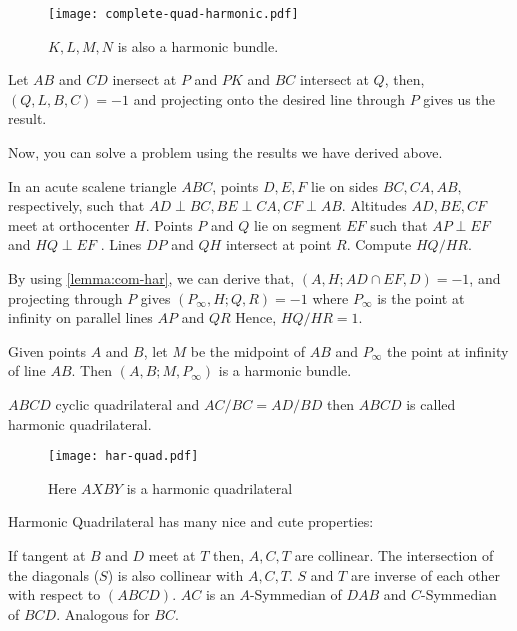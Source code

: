 \begin{figure}[h!t]
\centering
	\texttt{[image: complete-quad-harmonic.pdf]}
	\caption{$K,L,M,N$ is also a harmonic bundle.}
\end{figure}

Let $AB$ and $CD$ inersect at $P$ and $PK$ and $BC$ intersect at $Q$, then, $(Q,L,B,C)=-1$ and projecting onto the desired line through $P$ gives us the result.

Now, you can solve a problem using the results we have derived above.

\begin{example}
In an acute scalene triangle $ABC$, points $D, E, 
F$ lie on sides $BC, CA, AB,$ respectively, such that $AD \perp BC, BE \perp CA, CF \perp AB$.
Altitudes $AD, BE, CF$ meet at orthocenter $H$. 
Points $P$ and $Q$ lie on segment $EF$ such that 
$AP \perp EF$ and $H Q \perp EF$ . Lines $DP$ and $QH$  intersect 
at point $R$. Compute $HQ/HR$.
\end{example}

By using \autoref{lemma:com-har},  we can derive that,  
$(A,H; AD \cap EF , D)=-1$, and projecting through $P$
 gives  $(P_{\infty}, H ; Q, R)=-1$ where $P_{\infty}$
 is the point at infinity on parallel lines $AP$ and
  $QR$ Hence, $HQ/HR=1$.

\begin{lemma}
Given points $A$ and $B$, let $M$ be the
midpoint of $AB$ and $P_{\infty}$ the point at infinity of line $AB$. Then $(A, B; M, P_{\infty})$ is a harmonic bundle.
\end{lemma}

\begin{proposition}
$ABCD$ cyclic quadrilateral and $AC/BC = AD/BD$ then $ABCD$ is called harmonic quadrilateral.
\end{proposition}
\begin{figure}[h!t]
\centering
	\texttt{[image: har-quad.pdf]}%
	\caption{Here $AXBY$ is a harmonic quadrilateral}
\end{figure}
Harmonic Quadrilateral has many nice and cute properties:
\begin{enumerate}[{\textbf (a)}]
	\ii If tangent at $B$ and $D$ meet at $T$ then, $A,C,T$ are collinear. The intersection of the diagonals ($S$) is also collinear with $A,C,T$.
	\ii $S$ and $T$ are inverse of each other with respect to $(ABCD)$.
	\ii $AC$ is an $A$-Symmedian of $DAB$ and $C$-Symmedian of $BCD$. Analogous for $BC$.
\end{enumerate}


